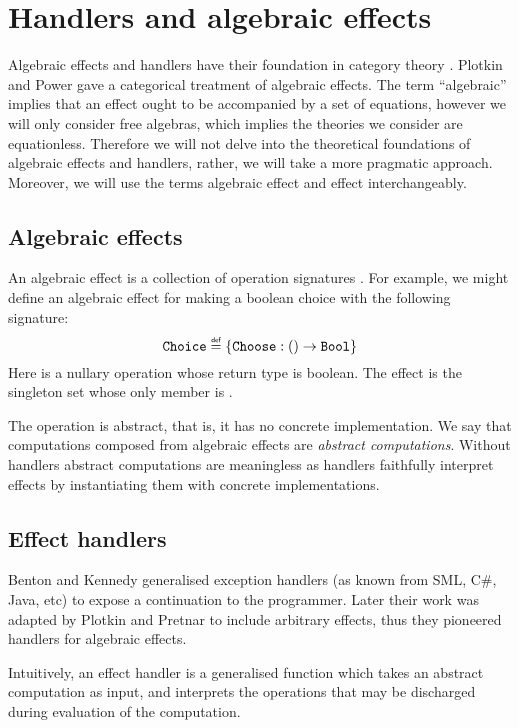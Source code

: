 \section{Handlers and algebraic effects}\label{sec:handlers-and-effects}
Algebraic effects and handlers have their foundation in category theory \cite{Plotkin2001a,Plotkin2013}. Plotkin and Power \cite{Plotkin2001b,Plotkin2001a} gave a categorical treatment of algebraic effects. The term ``algebraic'' implies that an effect ought to be accompanied by a set of equations, however we will only consider free algebras, which implies the theories we consider are equationless. Therefore we will not delve into the theoretical foundations of algebraic effects and handlers, rather, we will take a more pragmatic approach. Moreover, we will use the terms algebraic effect and effect interchangeably.

\subsection{Algebraic effects}
An algebraic effect is a collection of operation signatures \cite{Lindley2014}. For example, we might define an algebraic effect  for making a boolean choice with the following signature:
\[ \type{Choice} \defas \{ \type{Choose}: () \to \type{Bool} \} \]
Here  is a nullary operation whose return type is boolean. The effect  is the singleton set whose only member is . 

The operation  is abstract, that is, it has no concrete implementation. We say that computations composed from algebraic effects are \emph{abstract computations}. Without handlers abstract computations are meaningless as handlers faithfully interpret effects by instantiating them with concrete implementations. 

\subsection{Effect handlers}
Benton and Kennedy generalised exception handlers \cite{Benton2001} (as known from SML, C\#, Java, etc) to expose a continuation to the programmer. Later their work was adapted by Plotkin and Pretnar \cite{Plotkin2013} to include arbitrary effects, thus they pioneered handlers for algebraic effects.

Intuitively, an effect handler is a generalised function which takes an abstract computation as input, and interprets the operations that may be discharged during evaluation of the computation. 


